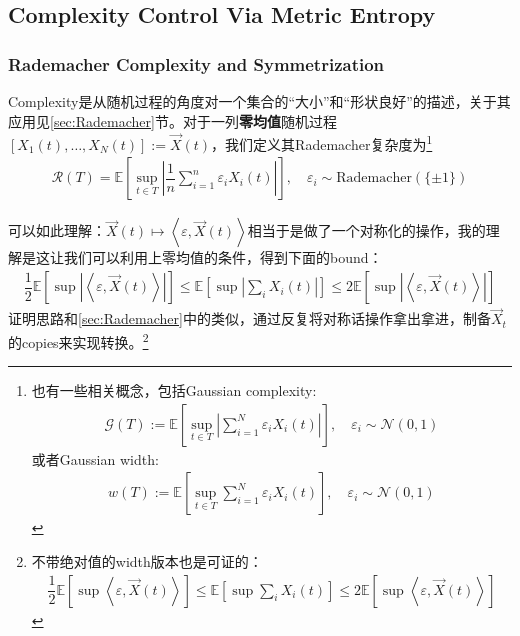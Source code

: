 \documentclass[11pt,a4paper]{ctexart}
\numberwithin{equation}{section}%
\begin{document}
\subsection{Complexity Control Via Metric Entropy}

\subsubsection{Rademacher Complexity and Symmetrization}\label{sec:Complexity}
Complexity是从随机过程的角度对一个集合的“大小”和“形状良好”的描述，关于其应用见\ref{sec:Rademacher}节。对于一列\textbf{零均值}随机过程$ [X_1(t),\ldots,X_N(t)]:= \vec{X}(t) $，我们定义其Rademacher复杂度为\footnote{也有一些相关概念，包括Gaussian complexity:
\begin{align*}
    \mathcal{G}(T):= \mathbb{E}\left[ \sup_{t\in T} \left\vert \sum_{i=1}^N \varepsilon_i X_i(t) \right\vert  \right],\quad \varepsilon_i\sim \mathcal{N}(0,1) 
\end{align*}
或者Gaussian width:
\begin{align*}
    w(T):= \mathbb{E}\left[ \sup_{t\in T}  \sum_{i=1}^N \varepsilon_i X_i(t)   \right],\quad \varepsilon_i\sim \mathcal{N}(0,1) 
\end{align*}
}
\begin{align*}
    \mathcal{R}(T)= \mathbb{E}\left[ \sup_{t \in T} \left\vert \dfrac{ 1 }{ n } \sum_{i=1}^n \varepsilon_i X_i(t) \right\vert  \right],\quad \varepsilon_i\sim \text{Rademacher}(\{\pm 1\})
\end{align*}

可以如此理解：$ \vec{X}(t)\mapsto \left\langle \varepsilon ,\vec{X}(t) \right\rangle  $相当于是做了一个对称化的操作，我的理解是这让我们可以利用上零均值的条件，得到下面的bound：
\begin{align*}
    \dfrac{ 1 }{ 2 }\mathbb{E}\left[ \sup \left\vert \left\langle \varepsilon ,\vec{X}(t) \right\rangle   \right\vert  \right]   \leq \mathbb{E}\left[ \sup \left\vert \sum _i X_i(t) \right\vert  \right] \leq 2\mathbb{E}\left[ \sup \left\vert \left\langle \varepsilon ,\vec{X}(t) \right\rangle   \right\vert  \right]
\end{align*}
证明思路和\ref{sec:Rademacher}中的类似，通过反复将对称话操作拿出拿进，制备$ \vec{X}_t $的copies来实现转换。\footnote{
    不带绝对值的width版本也是可证的：
    \begin{align*}
        \dfrac{ 1 }{ 2 } \mathbb{E}\left[ \sup \left\langle \varepsilon ,\vec{X}(t) \right\rangle  \right] \leq \mathbb{E}\left[ \sup \sum_{i} X_i(t) \right] \leq 2\mathbb{E}\left[ \sup \left\langle \varepsilon ,\vec{X}(t) \right\rangle  \right]  
    \end{align*}
}
\end{document}

